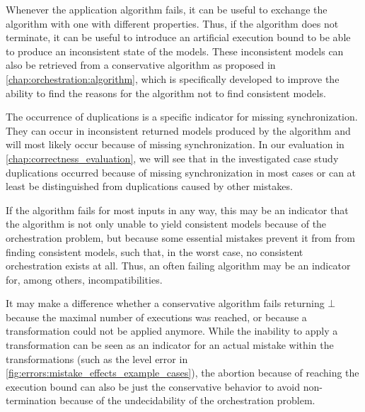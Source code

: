 Whenever the application algorithm fails, it can be useful to exchange the algorithm with one with different properties.
Thus, if the algorithm does not terminate, it can be useful to introduce an artificial execution bound to be able to produce an inconsistent state of the models.
These inconsistent models can also be retrieved from a conservative algorithm as proposed in \autoref{chap:orchestration:algorithm}, which is specifically developed to improve the ability to find the reasons for the algorithm not to find consistent models.

The occurrence of duplications is a specific indicator for missing synchronization.
They can occur in inconsistent returned models produced by the algorithm and will most likely occur because of missing synchronization.
In our evaluation in \autoref{chap:correctness_evaluation}, we will see that in the investigated case study duplications occurred because of missing synchronization in most cases or can at least be distinguished from duplications caused by other mistakes.

If the algorithm fails for most inputs in any way, this may be an indicator that the algorithm is not only unable to yield consistent models because of the orchestration problem, but because some essential mistakes prevent it from from finding consistent models, such that, in the worst case, no consistent orchestration exists at all.
Thus, an often failing algorithm may be an indicator for, among others, incompatibilities.

It may make a difference whether a conservative algorithm fails returning $\bot$ because the maximal number of executions was reached, or because a transformation could not be applied anymore.
While the inability to apply a transformation can be seen as an indicator for an actual mistake within the transformations (such as the \levelnetworkrelation level error in \autoref{fig:errors:mistake_effects_example_cases}), the abortion because of reaching the execution bound can also be just the conservative behavior to avoid non-termination because of the undecidability of the orchestration problem.

